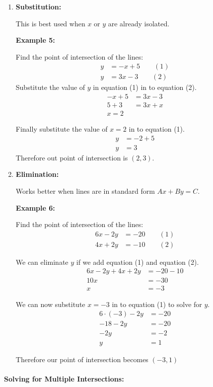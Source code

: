 \documentclass[english,12pt]{article}
\theoremstyle{plain}
\theoremstyle{definition}
\theoremstyle{definition} %
\newcommand{\enum}[1]{\begin{enumerate} #1 \end{enumerate}}
\begin{document}
\enum{
\item
\textbf{Substitution:}

This is best used when $x$ or $y$ are already isolated.

\textbf{Example 5:}

Find the point of intersection of the lines:
\begin{align*}
y&=-x+5\qquad (1)\\
y&=3x-3\qquad (2)
\end{align*}
Substitute the value of $y$ in equation (1) in to equation (2).
\begin{align*}
-x+5&=3x-3\\
5+3&=3x+x\\
x=2
\end{align*}

Finally substitute the value of $x=2$ in to equation (1).
\begin{align*}
y&=-2+5\\
y&=3
\end{align*}
Therefore out point of intersection is $(2,3)$.

\item
\textbf{Elimination:}

Works better when lines are in standard form $Ax+By=C$.

\textbf{Example 6:}

Find the point of intersection of the lines:
\begin{align*}
6x-2y&=-20\qquad (1)\\
4x+2y&=-10\qquad (2)
\end{align*}

We can eliminate $y$ if we add equation (1) and equation (2).
\begin{align*}
6x-2y+4x+2y&=-20-10\\
10x&=-30\\
x&=-3
\end{align*}

We can now substitute $x=-3$ in to equation (1) to solve for $y$.
\begin{align*}
6\cdot(-3)-2y&=-20\\
-18-2y&=-20\\
-2y&=-2\\
y&=1
\end{align*}

Therefore our point of intersection becomes $(-3,1)$

}

\paragraph{Solving for Multiple Intersections:}\
\end{document}
